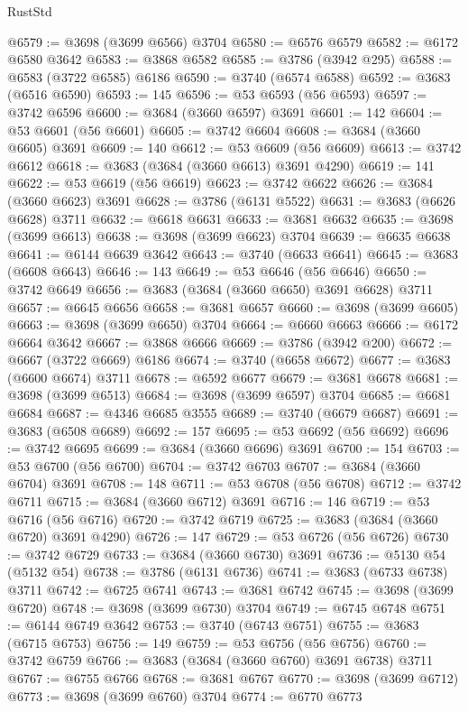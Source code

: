 \begin{lexlean}{RustStd}
\begin{coremodule}
@6579 := @3698 (@3699 @6566) @3704
@6580 := @6576 @6579
@6582 := @6172 @6580 @3642
@6583 := @3868 @6582
@6585 := @3786 (@3942 @295)
@6588 := @6583 (@3722 @6585) @6186
@6590 := @3740 (@6574 @6588)
@6592 := @3683 (@6516 @6590)
@6593 := 145
@6596 := @53 @6593 (@56 @6593)
@6597 := @3742 @6596
@6600 := @3684 (@3660 @6597) @3691
@6601 := 142
@6604 := @53 @6601 (@56 @6601)
@6605 := @3742 @6604
@6608 := @3684 (@3660 @6605) @3691
@6609 := 140
@6612 := @53 @6609 (@56 @6609)
@6613 := @3742 @6612
@6618 := @3683 (@3684 (@3660 @6613) @3691 @4290)
@6619 := 141
@6622 := @53 @6619 (@56 @6619)
@6623 := @3742 @6622
@6626 := @3684 (@3660 @6623) @3691
@6628 := @3786 (@6131 @5522)
@6631 := @3683 (@6626 @6628) @3711
@6632 := @6618 @6631
@6633 := @3681 @6632
@6635 := @3698 (@3699 @6613)
@6638 := @3698 (@3699 @6623) @3704
@6639 := @6635 @6638
@6641 := @6144 @6639 @3642
@6643 := @3740 (@6633 @6641)
@6645 := @3683 (@6608 @6643)
@6646 := 143
@6649 := @53 @6646 (@56 @6646)
@6650 := @3742 @6649
@6656 := @3683 (@3684 (@3660 @6650) @3691 @6628) @3711
@6657 := @6645 @6656
@6658 := @3681 @6657
@6660 := @3698 (@3699 @6605)
@6663 := @3698 (@3699 @6650) @3704
@6664 := @6660 @6663
@6666 := @6172 @6664 @3642
@6667 := @3868 @6666
@6669 := @3786 (@3942 @200)
@6672 := @6667 (@3722 @6669) @6186
@6674 := @3740 (@6658 @6672)
@6677 := @3683 (@6600 @6674) @3711
@6678 := @6592 @6677
@6679 := @3681 @6678
@6681 := @3698 (@3699 @6513)
@6684 := @3698 (@3699 @6597) @3704
@6685 := @6681 @6684
@6687 := @4346 @6685 @3555
@6689 := @3740 (@6679 @6687)
@6691 := @3683 (@6508 @6689)
@6692 := 157
@6695 := @53 @6692 (@56 @6692)
@6696 := @3742 @6695
@6699 := @3684 (@3660 @6696) @3691
@6700 := 154
@6703 := @53 @6700 (@56 @6700)
@6704 := @3742 @6703
@6707 := @3684 (@3660 @6704) @3691
@6708 := 148
@6711 := @53 @6708 (@56 @6708)
@6712 := @3742 @6711
@6715 := @3684 (@3660 @6712) @3691
@6716 := 146
@6719 := @53 @6716 (@56 @6716)
@6720 := @3742 @6719
@6725 := @3683 (@3684 (@3660 @6720) @3691 @4290)
@6726 := 147
@6729 := @53 @6726 (@56 @6726)
@6730 := @3742 @6729
@6733 := @3684 (@3660 @6730) @3691
@6736 := @5130 @54 (@5132 @54)
@6738 := @3786 (@6131 @6736)
@6741 := @3683 (@6733 @6738) @3711
@6742 := @6725 @6741
@6743 := @3681 @6742
@6745 := @3698 (@3699 @6720)
@6748 := @3698 (@3699 @6730) @3704
@6749 := @6745 @6748
@6751 := @6144 @6749 @3642
@6753 := @3740 (@6743 @6751)
@6755 := @3683 (@6715 @6753)
@6756 := 149
@6759 := @53 @6756 (@56 @6756)
@6760 := @3742 @6759
@6766 := @3683 (@3684 (@3660 @6760) @3691 @6738) @3711
@6767 := @6755 @6766
@6768 := @3681 @6767
@6770 := @3698 (@3699 @6712)
@6773 := @3698 (@3699 @6760) @3704
@6774 := @6770 @6773

\end{coremodule}
\end{lexlean}
